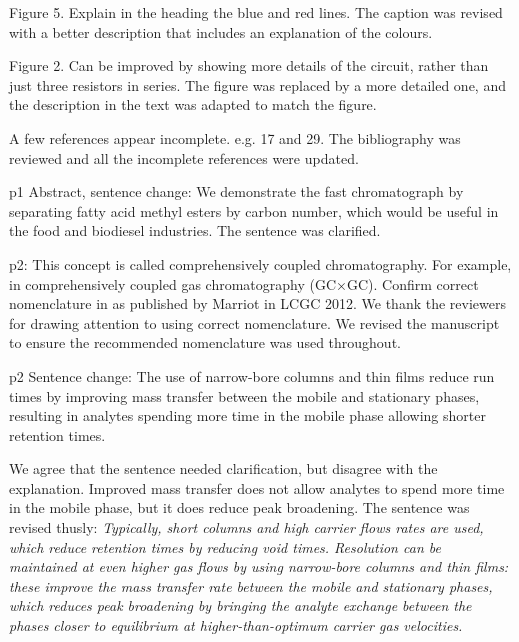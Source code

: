 \documentclass[10pt]{article}
\begin{document}
\begin{response}{Figure 5. Explain in the heading the blue and red lines.
	}  
	The caption was revised with a better description that includes an explanation of the colours.
\end{response}

\begin{response}{Figure 2. Can be improved by showing more details of the
circuit, rather than just three resistors in series.
	}  The figure was replaced by a more detailed one, and the description in the text was adapted to match the figure.   
\end{response}

\begin{response}{A few references appear incomplete. e.g. 17 and 29.}  
	The bibliography was reviewed and all the incomplete references were updated.
\end{response}


\begin{response}{p1 Abstract, sentence change: We demonstrate the fast
chromatograph by separating fatty acid methyl esters by carbon number, which
would be useful in the food and biodiesel industries.
	}  
	The sentence was clarified. 
\end{response}

\begin{response}{p2: This concept is called comprehensively coupled
chromatography. For example, in comprehensively coupled gas chromatography
(GC×GC). Confirm correct nomenclature in as published by Marriot in LCGC 2012.
	} We thank the reviewers for drawing attention to using correct nomenclature. We
	revised the manuscript to ensure the recommended nomenclature was used throughout.
\end{response}

\begin{response}{p2 Sentence change: The use of narrow-bore columns and thin
films reduce run times by improving mass transfer between the mobile and
stationary phases, resulting in analytes spending more time in the mobile phase
allowing shorter retention times.

	} We agree that the sentence needed clarification, but disagree with the
	explanation. Improved mass transfer does not allow analytes to spend more time
	in the mobile phase, but it does reduce peak broadening.  The sentence was
	revised thusly: \textit{Typically, short columns and high carrier flows rates
	are used, which reduce retention times by reducing void times. Resolution can be
	maintained at even higher gas flows by using narrow-bore columns and thin films:
	these improve the mass transfer rate between the mobile and stationary phases,
	which reduces peak broadening by bringing the analyte exchange between the
	phases closer to equilibrium at higher-than-optimum carrier gas velocities.}

\end{response}
\end{document}
